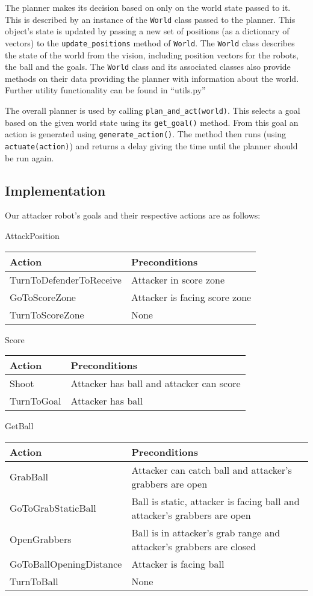 \documentclass{article}
\begin{document}
The planner makes its decision based on only on the world state passed to it. This is described by an instance of the \lstinline|World| class passed to the planner. This object's state is updated by passing a new set of positions (as a dictionary of vectors) to the \lstinline|update_positions| method of \lstinline|World|. The \lstinline|World| class describes the state of the world from the vision, including position vectors for the robots, the ball and the goals. The \lstinline|World| class and its associated classes also provide methods on their data providing the planner with information about the world. Further utility functionality can be found in ``utils.py''

The overall planner is used by calling \lstinline{plan_and_act(world)}. This selects a goal based on the given world state  using its \lstinline|get_goal()| method. From this goal an action is generated using \lstinline|generate_action()|. The method then runs (using \lstinline|actuate(action)|) and returns a delay giving the time until the planner should be run again.

\subsection{Implementation}

Our attacker robot's goals and their respective actions are as follows:

AttackPosition

\begin{tabular}{ | l | l | }
\hline
Action & Preconditions \\ \hline
TurnToDefenderToReceive & Attacker in score zone \\ \hline
GoToScoreZone & Attacker is facing score zone  \\ \hline
TurnToScoreZone & None \\
\hline
\end{tabular}

Score

\begin{tabular}{ | l | l | }
\hline
Action & Preconditions \\ \hline
Shoot & Attacker has ball and attacker can score \\ \hline
TurnToGoal & Attacker has ball \\
\hline
\end{tabular}

GetBall

\begin{tabular}{ | l | l | }
\hline
Action & Preconditions \\ \hline
GrabBall & Attacker can catch ball and attacker's grabbers are open \\ \hline
GoToGrabStaticBall & Ball is static, attacker is facing ball and attacker's grabbers are open \\ \hline
OpenGrabbers & Ball is in attacker's grab range and attacker's grabbers are closed \\ \hline
GoToBallOpeningDistance & Attacker is facing ball \\ \hline
TurnToBall & None \\
\hline
\end{tabular}
\end{document}

